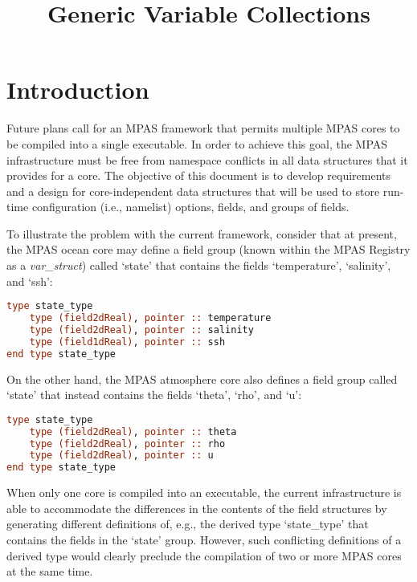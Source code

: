 \documentclass[11pt]{report}
\begin{document}
\title{Generic Variable Collections}
\author{}

\maketitle
\tableofcontents


%
%
\chapter{Introduction}

Future plans call for an MPAS framework that permits multiple MPAS cores to be compiled into a single executable. In order to achieve this goal,
the MPAS infrastructure must be free from namespace conflicts in all data structures that it provides for a core. The objective of this document is to develop 
requirements and a design for core-independent data structures that will be used to store run-time configuration (i.e., namelist) options, fields, and groups of fields. 

To illustrate the problem with the current framework, consider that at present, the MPAS ocean core may define a field group (known within the MPAS Registry as a {\em var\_struct}) called `state' that contains the fields `temperature', `salinity', and `ssh':


\begin{lstlisting}[language=fortran,escapechar=@,frame=single]
type state_type
	type (field2dReal), pointer :: temperature
	type (field2dReal), pointer :: salinity
	type (field1dReal), pointer :: ssh
end type state_type
\end{lstlisting}

\noindent On the other hand, the MPAS atmosphere core also defines a field group called `state' that instead contains the fields `theta', `rho', and `u':

\begin{lstlisting}[language=fortran,escapechar=@,frame=single]
type state_type
	type (field2dReal), pointer :: theta
	type (field2dReal), pointer :: rho
	type (field2dReal), pointer :: u
end type state_type
\end{lstlisting}

\noindent When only one core is compiled into an executable, the current infrastructure is able to accommodate the differences in the contents of the field structures by generating different definitions of, e.g., the derived type `state\_type' that contains the fields in the `state' group. However, such conflicting definitions of a derived type would clearly preclude the compilation of two or more MPAS cores at the same time. 
\end{document}
